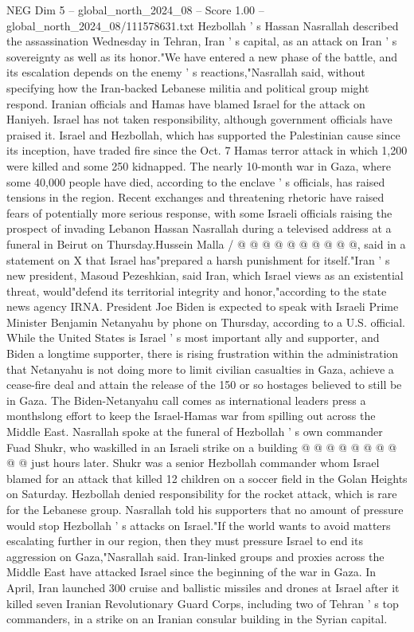 \begin{textsample}{NEG Dim 5 – global\_north\_2024\_08 – Score 1.00 – global\_north\_2024\_08/111578631.txt}  \label{ex:f5_neg_072}
Hezbollah ' s Hassan Nasrallah described the assassination Wednesday in Tehran, Iran ' s capital, as an attack on Iran ' s sovereignty as well as its honor."We have entered a new phase of the battle, and its escalation depends on the enemy ' s reactions,"Nasrallah said, without specifying how the Iran-backed Lebanese militia and political group might respond.
Iranian officials and Hamas have blamed Israel for the attack on Haniyeh.
Israel has not taken responsibility, although government officials have praised it.
Israel and Hezbollah, which has supported the Palestinian cause since its inception, have traded fire since the Oct. 7 Hamas terror attack in which 1,200 were killed and some 250 kidnapped.
The nearly 10-month war in Gaza, where some 40,000 people have died, according to the enclave ' s officials, has raised tensions in the region.
Recent exchanges and threatening rhetoric have raised fears of potentially more serious response, with some Israeli officials raising the prospect of invading Lebanon Hassan Nasrallah during a televised address at a funeral in Beirut on Thursday.Hussein Malla / @ @ @ @ @ @ @ @ @ @, said in a statement on X that Israel has"prepared a harsh punishment for itself."Iran ' s new president, Masoud Pezeshkian, said Iran, which Israel views as an existential threat, would"defend its territorial integrity and honor,"according to the state news agency IRNA.
President Joe Biden is expected to speak with Israeli Prime Minister Benjamin Netanyahu by phone on Thursday, according to a U.S. official.
While the United States is Israel ' s most important ally and supporter, and Biden a longtime supporter, there is rising frustration within the administration that Netanyahu is not doing more to limit civilian casualties in Gaza, achieve a cease-fire deal and attain the release of the 150 or so hostages believed to still be in Gaza.
The Biden-Netanyahu call comes as international leaders press a monthslong effort to keep the Israel-Hamas war from spilling out across the Middle East.
Nasrallah spoke at the funeral of Hezbollah ' s own commander Fuad Shukr, who waskilled in an Israeli strike on a building @ @ @ @ @ @ @ @ @ @ just hours later.
Shukr was a senior Hezbollah commander whom Israel blamed for an attack that killed 12 children on a soccer field in the Golan Heights on Saturday.
Hezbollah denied responsibility for the rocket attack, which is rare for the Lebanese group.
Nasrallah told his supporters that no amount of pressure would stop Hezbollah ' s attacks on Israel."If the world wants to avoid matters escalating further in our region, then they must pressure Israel to end its aggression on Gaza,"Nasrallah said.
Iran-linked groups and proxies across the Middle East have attacked Israel since the beginning of the war in Gaza.
In April, Iran launched 300 cruise and ballistic missiles and drones at Israel after it killed seven Iranian Revolutionary Guard Corps, including two of Tehran ' s top commanders, in a strike on an Iranian consular building in the Syrian capital.

\end{textsample}
